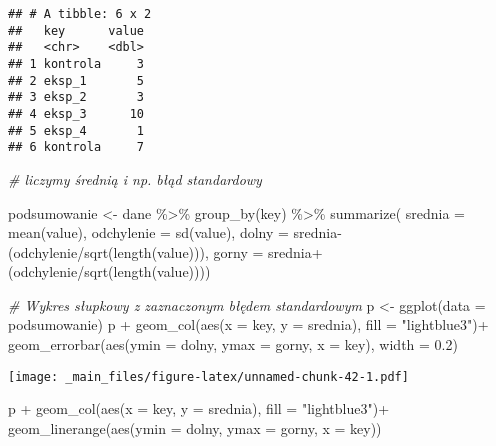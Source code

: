 \documentclass[
]{book}
\newenvironment{Shaded}{\begin{snugshade}}{\end{snugshade}}
\newcommand{\AttributeTok}[1]{\textcolor[rgb]{0.77,0.63,0.00}{#1}}
\newcommand{\CommentTok}[1]{\textcolor[rgb]{0.56,0.35,0.01}{\textit{#1}}}
\newcommand{\FloatTok}[1]{\textcolor[rgb]{0.00,0.00,0.81}{#1}}
\newcommand{\FunctionTok}[1]{\textcolor[rgb]{0.00,0.00,0.00}{#1}}
\newcommand{\NormalTok}[1]{#1}
\newcommand{\OtherTok}[1]{\textcolor[rgb]{0.56,0.35,0.01}{#1}}
\newcommand{\SpecialCharTok}[1]{\textcolor[rgb]{0.00,0.00,0.00}{#1}}
\newcommand{\StringTok}[1]{\textcolor[rgb]{0.31,0.60,0.02}{#1}}
\begin{document}
\begin{verbatim}
## # A tibble: 6 x 2
##   key      value
##   <chr>    <dbl>
## 1 kontrola     3
## 2 eksp_1       5
## 3 eksp_2       3
## 4 eksp_3      10
## 5 eksp_4       1
## 6 kontrola     7
\end{verbatim}

\begin{Shaded}
\begin{Highlighting}[]
\CommentTok{\# liczymy średnią i np. błąd standardowy}

\NormalTok{podsumowanie }\OtherTok{\textless{}{-}}\NormalTok{ dane }\SpecialCharTok{\%\textgreater{}\%} \FunctionTok{group\_by}\NormalTok{(key) }\SpecialCharTok{\%\textgreater{}\%}
  \FunctionTok{summarize}\NormalTok{(                      }\AttributeTok{srednia =} \FunctionTok{mean}\NormalTok{(value), }
                                  \AttributeTok{odchylenie =} \FunctionTok{sd}\NormalTok{(value), }
                                  \AttributeTok{dolny =}\NormalTok{ srednia}\SpecialCharTok{{-}}\NormalTok{(odchylenie}\SpecialCharTok{/}\FunctionTok{sqrt}\NormalTok{(}\FunctionTok{length}\NormalTok{(value))), }
                                  \AttributeTok{gorny =}\NormalTok{ srednia}\SpecialCharTok{+}\NormalTok{(odchylenie}\SpecialCharTok{/}\FunctionTok{sqrt}\NormalTok{(}\FunctionTok{length}\NormalTok{(value))))}

\CommentTok{\# Wykres słupkowy z zaznaczonym błędem standardowym}
\NormalTok{p }\OtherTok{\textless{}{-}} \FunctionTok{ggplot}\NormalTok{(}\AttributeTok{data =}\NormalTok{ podsumowanie)}
\NormalTok{p }\SpecialCharTok{+} \FunctionTok{geom\_col}\NormalTok{(}\FunctionTok{aes}\NormalTok{(}\AttributeTok{x =}\NormalTok{ key, }\AttributeTok{y =}\NormalTok{ srednia), }\AttributeTok{fill =} \StringTok{"lightblue3"}\NormalTok{)}\SpecialCharTok{+}
  \FunctionTok{geom\_errorbar}\NormalTok{(}\FunctionTok{aes}\NormalTok{(}\AttributeTok{ymin =}\NormalTok{ dolny, }\AttributeTok{ymax =}\NormalTok{ gorny, }\AttributeTok{x =}\NormalTok{ key), }\AttributeTok{width =} \FloatTok{0.2}\NormalTok{)}
\end{Highlighting}
\end{Shaded}

\texttt{[image: \_main\_files/figure-latex/unnamed-chunk-42-1.pdf]}

\begin{Shaded}
\begin{Highlighting}[]
\NormalTok{p }\SpecialCharTok{+} \FunctionTok{geom\_col}\NormalTok{(}\FunctionTok{aes}\NormalTok{(}\AttributeTok{x =}\NormalTok{ key, }\AttributeTok{y =}\NormalTok{ srednia), }\AttributeTok{fill =} \StringTok{"lightblue3"}\NormalTok{)}\SpecialCharTok{+}
  \FunctionTok{geom\_linerange}\NormalTok{(}\FunctionTok{aes}\NormalTok{(}\AttributeTok{ymin =}\NormalTok{ dolny, }\AttributeTok{ymax =}\NormalTok{ gorny, }\AttributeTok{x =}\NormalTok{ key))}
\end{Highlighting}
\end{Shaded}
\end{document}
